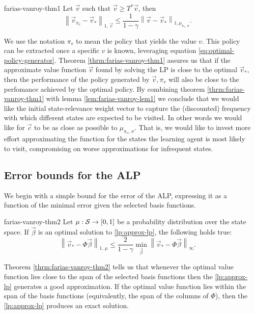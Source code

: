 \begin{thrm}{}{farias-vanroy-thm1}
    Let $\vec{v}$ such that $\vec{v} \geq T^{*} \vec{v}$, then
    \[
       \left\| \vec{v}_{\pi_v} - \vec{v}_* \right\|_{1,\, \vec{c}} \leq \frac{1}{1 - \gamma} \left\| \vec{v}  - \vec{v}_* \right\|_{1, \mu_{\pi_v, \, \sigma}}.
    \]
\end{thrm}

We use the notation $\pi_v$ to mean the policy that yields the value $v$. This
policy can be extracted once a specific $v$ is known, leveraging equation
\eqref{eq:optimal-policy-generator}. Theorem \ref{thrm:farias-vanroy-thm1}
assures us that if the approximate value function $\vec{v}$ found by solving the
LP is close to the optimal $\vec{v}_{*}$, then the performance of the policy
generated by $\vec{v}, \pi_v$  will also be close to the perfomance achieved by
the optimal policy. By combining theorem \ref{thrm:farias-vanroy-thm1} with
lemma \ref{lem:farias-vanroy-lem1} we conclude that we would like the initial
state-relevance weight vector to capture the (discounted) frequency with which
different states are expected to be visited. In other words we would like for
$\vec{c}$ to be as close as possible to $\mu_{\pi_v, \, \sigma}$. That is, we
would like to invest more effort approximating the function for the states the
learning agent is most likely to visit, compromising on worse approximations for
infrequent states.

\subsection{Error bounds for the ALP}
We begin with a simple bound for the error of the ALP, expressing it as a
function of the minimal error given the selected basis functions.

\begin{thrm}{}{farias-vanroy-thm2}
    Let $\mu: \mathcal{S} \to [0,1]$ be a probability distribution over the state
    space. If $\vec{\beta}$ is an optimal solution to \eqref{lp:approx-lp}, the
    following holds true:
    \[
        \left\| \vec{v}_* - \Phi \vec{\beta} \right\|_{1, \, \mu} \leq \frac{2}{1- \gamma} \min_{\vec{\beta}} \left\| \vec{v}_* - \Phi \vec{\beta} \right\|_{\infty}.
    \]
\end{thrm}

Theorem \ref{thrm:farias-vanroy-thm2} tells us that whenever the optimal value
function lies close to the span of the selected basis functions then the
\eqref{lp:approx-lp} generates a good approximation. If the optimal value
function lies within the span of the basis functions (equivalently, the span of
the columns of $\Phi$), then the \eqref{lp:approx-lp} produces an exact
solution.

